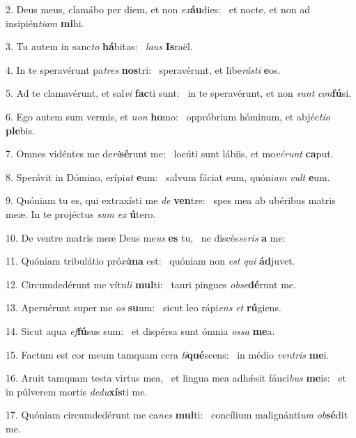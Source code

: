 2. Deus meus, clamábo per diem, et non \textit{ex}\textbf{áu}dies: \ast\  et nocte, et non ad insipién\textit{ti}\textit{am} \textbf{mi}hi.\

3. Tu autem in sanc\textit{to} \textbf{há}bitas: \ast\  \textit{laus} \textbf{Is}raël.\

4. In te speravérunt pa\textit{tres} \textbf{nos}tri: \ast\  speravérunt, et libe\textit{rás}\textit{ti} \textbf{e}os.\

5. Ad te clamavérunt, et sal\textit{vi} \textbf{fac}ti sunt: \ast\  in te speravérunt, et non \textit{sunt} \textit{con}\textbf{fú}si.\

6. Ego autem sum vermis, et \textit{non} \textbf{ho}mo: \ast\  oppróbrium hóminum, et abjéc\textit{ti}\textit{o} \textbf{ple}bis.\

7. Omnes vidéntes me de\textit{ri}\textbf{sé}runt me: \ast\  locúti sunt lábiis, et mo\textit{vé}\textit{runt} \textbf{ca}put.\

8. Sperávit in Dómino, erípi\textit{at} \textbf{e}um: \ast\  salvum fáciat eum, quóni\textit{am} \textit{vult} \textbf{e}um.\

9. Quóniam tu es, qui extraxísti me \textit{de} \textbf{ven}tre: \ast\  spes mea ab ubéribus matris meæ. In te projéctus \textit{sum} \textit{ex} \textbf{ú}tero.\

10. De ventre matris meæ Deus me\textit{us} \textbf{es} tu, \ast\  ne discés\textit{se}\textit{ris} \textbf{a} me:\

11. Quóniam tribulátio pró\textit{xi}\textbf{ma} est: \ast\  quóniam non \textit{est} \textit{qui} \textbf{ád}juvet.\

12. Circumdedérunt me vítu\textit{li} \textbf{mul}ti: \ast\  tauri pingues \textit{ob}\textit{se}\textbf{dé}runt me.\

13. Aperuérunt super me \textit{os} \textbf{su}um: \ast\  sicut leo rápi\textit{ens} \textit{et} \textbf{rú}giens.\

14. Sicut aqua \textit{ef}\textbf{fú}sus sum: \ast\  et dispérsa sunt ómnia \textit{os}\textit{sa} \textbf{me}a.\

15. Factum est cor meum tamquam cera \textit{li}\textbf{qué}scens: \ast\  in médio \textit{ven}\textit{tris} \textbf{me}i.\

16. Aruit tamquam testa virtus mea, \dag\  et lingua mea adhǽsit fáuci\textit{bus} \textbf{me}is: \ast\  et in púlverem mortis \textit{de}\textit{du}\textbf{xís}ti me.\

17. Quóniam circumdedérunt me ca\textit{nes} \textbf{mul}ti: \ast\  concílium malignánti\textit{um} \textit{ob}\textbf{sé}dit me.\

